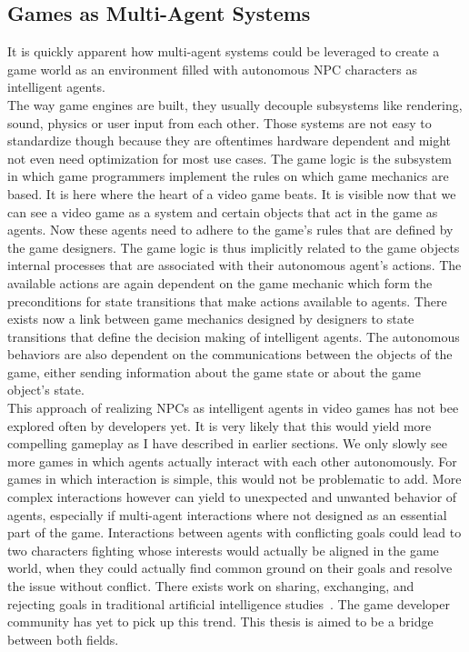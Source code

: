 \subsection{Games as Multi-Agent Systems}
It is quickly apparent how multi-agent systems could be leveraged to create a game world as an environment filled with autonomous NPC characters as intelligent agents.\\
The way game engines are built, they usually decouple subsystems like rendering, sound, physics or user input from each other. Those systems are not easy to standardize though because they are oftentimes hardware dependent and might not even need optimization for most use cases. The game logic is the subsystem in which game programmers implement the rules on which game mechanics are based. It is here where the heart of a video game beats. It is visible now that we can see a video game as a system and certain objects that act in the game as agents. Now these agents need to adhere to the game's rules that are defined by the game designers. The game logic is thus implicitly related to the game objects internal processes that are associated with their autonomous agent's actions. The available actions are again dependent on the game mechanic which form the preconditions for state transitions that make actions available to agents. There exists now a link between game mechanics designed by designers to state transitions that define the decision making of intelligent agents. The autonomous behaviors are also dependent on the communications between the objects of the game, either sending information about the game state or about the game object's state.~\cite{MarinLora2020}\\
This approach of realizing NPCs as intelligent agents in video games has not bee explored often by developers yet. It is very likely that this would yield more compelling gameplay as I have described in earlier sections. We only slowly see more games in which agents actually interact with each other autonomously. For games in which interaction is simple, this would not be problematic to add. More complex interactions however can yield to unexpected and unwanted behavior of agents, especially if multi-agent interactions where not designed as an essential part of the game. Interactions between agents with conflicting goals could lead to two characters fighting whose interests would actually be aligned in the game world, when they could actually find common ground on their goals and resolve the issue without conflict. There exists work on sharing, exchanging, and rejecting goals in traditional artificial intelligence studies~\cite{Kraus1997}. The game developer community has yet to pick up this trend. This thesis is aimed to be a bridge between both fields.~\cite{Dignum2009}\\
